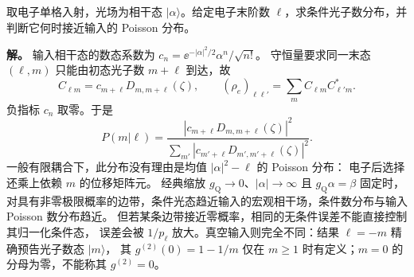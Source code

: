 \begin{exbox}[相干输入的精确条件分布及经典极限的限制]
取电子单格入射，光场为相干态 $|\alpha\rangle$。给定电子末阶数 $\ell$，求条件光子数分布，并判断它何时接近输入的 Poisson 分布。

\textbf{解。} 输入相干态的数态系数为 $c_n=\ee^{-|\alpha|^2/2}\alpha^n/\sqrt{n!}$。
守恒量要求同一末态 $(\ell,m)$ 只能由初态光子数 $m+\ell$ 到达，故
\begin{equation}
 C_{\ell m}=c_{m+\ell}D_{m,m+\ell}(\zeta),\qquad
 (\rho_e)_{\ell\ell'}=\sum_mC_{\ell m}C_{\ell'm}^*.
 \label{eq:feqo-coherent-reduced-exact}
\end{equation}
负指标 $c_n$ 取零。于是
\begin{equation}
 P(m|\ell)=\frac{|c_{m+\ell}D_{m,m+\ell}(\zeta)|^2}
 {\sum_{m'}|c_{m'+\ell}D_{m',m'+\ell}(\zeta)|^2}.
 \label{eq:feqo-pinem-conditional}
\end{equation}
一般有限耦合下，此分布没有理由是均值 $|\alpha|^2-\ell$ 的 Poisson 分布：
电子后选择还乘上依赖 $m$ 的位移矩阵元。
经典缩放 $g_{\mathrm Q}\to0$、$|\alpha|\to\infty$ 且 $g_{\mathrm Q}\alpha=\beta$ 固定时，
对具有非零极限概率的边带，条件光态趋近输入的宏观相干场，条件数分布与输入 Poisson 数分布趋近。
但若某条边带接近零概率，相同的无条件误差不能直接控制其归一化条件态，
误差会被 $1/p_\ell$ 放大。真空输入则完全不同：结果 $\ell=-m$ 精确预告光子数态 $|m\rangle$，
其 $g^{(2)}(0)=1-1/m$ 仅在 $m\ge1$ 时有定义；$m=0$ 的分母为零，不能称其 $g^{(2)}=0$。
\end{exbox}


